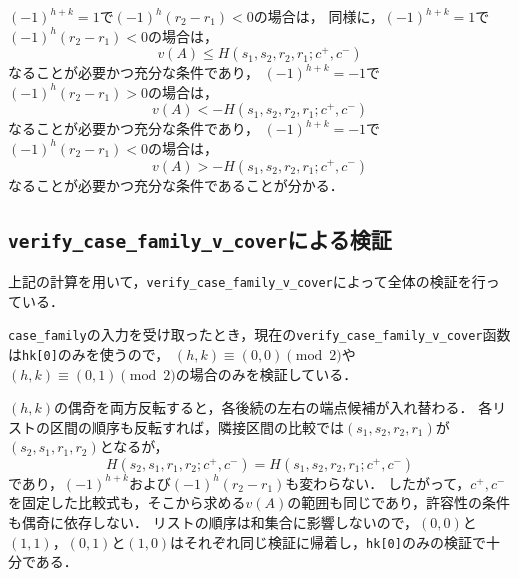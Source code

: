 \documentclass[10pt,a4paper]{ujarticle}
\theoremstyle{definition}
\begin{document}
$(-1)^{h + k} = 1$で$(-1)^h(r_2 - r_1) < 0$の場合は，
同様に，$(-1)^{h + k} = 1$で$(-1)^h(r_2 - r_1) < 0$の場合は，
\[
v(A) \le H(s_1, s_2, r_2, r_1; c^+ , c^-)
\]
なることが必要かつ充分な条件であり，
$(-1)^{h + k} = -1$で$(-1)^h(r_2 - r_1) > 0$の場合は，
\[
v(A) < - H(s_1, s_2, r_2, r_1; c^+ , c^-)
\]
なることが必要かつ充分な条件であり，
$(-1)^{h + k} = -1$で$(-1)^h(r_2 - r_1) < 0$の場合は，
\[
v(A) > - H(s_1, s_2, r_2, r_1; c^+ , c^-)
\]
なることが必要かつ充分な条件であることが分かる．

\subsection{\texttt{verify\_case\_family\_v\_cover}による検証}
上記の計算を用いて，\verb|verify_case_family_v_cover|によって全体の検証を行っている．

\verb|case_family|の入力を受け取ったとき，現在の\verb|verify_case_family_v_cover|函数は\verb|hk[0]|のみを使うので，
$(h,k)\equiv(0,0)\pmod2$や$(h,k)\equiv(0,1)\pmod2$の場合のみを検証している．

$(h,k)$の偶奇を両方反転すると，各後続の左右の端点候補が入れ替わる．
各リストの区間の順序も反転すれば，隣接区間の比較では$(s_1,s_2,r_2,r_1)$が$(s_2,s_1,r_1,r_2)$となるが，
\[
 H(s_2,s_1,r_1,r_2;c^+,c^-)=H(s_1,s_2,r_2,r_1;c^+,c^-)
\]
であり，$(-1)^{h+k}$および$(-1)^h(r_2-r_1)$も変わらない．
したがって，$c^+,c^-$を固定した比較式も，そこから求める$v(A)$の範囲も同じであり，許容性の条件も偶奇に依存しない．
リストの順序は和集合に影響しないので，$(0,0)$と$(1,1)$，$(0,1)$と$(1,0)$はそれぞれ同じ検証に帰着し，\verb|hk[0]|のみの検証で十分である．
\end{document}
